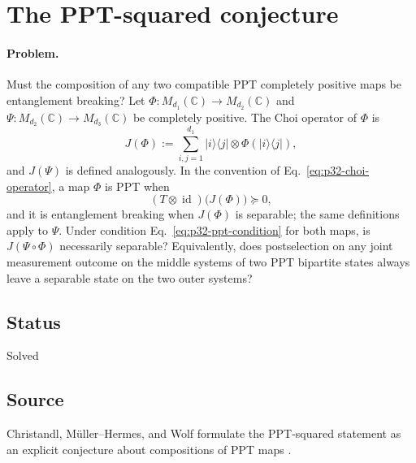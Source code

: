 \section{The PPT-squared conjecture}
\label{sec:op_69520395226dc45a}

\paragraph{Problem.}
Must the composition of any two compatible PPT completely positive maps be
entanglement breaking?  Let
$\Phi:M_{d_1}(\mathbb C)\to M_{d_2}(\mathbb C)$ and
$\Psi:M_{d_2}(\mathbb C)\to M_{d_3}(\mathbb C)$ be completely positive.  The
Choi operator of $\Phi$ is
\begin{equation}
  J(\Phi)
  :=\sum_{i,j=1}^{d_1}\lvert i\rangle\!\langle j\rvert
       \otimes\Phi(\lvert i\rangle\!\langle j\rvert),
  \label{eq:p32-choi-operator}
\end{equation}
and $J(\Psi)$ is defined analogously.  In the convention of
Eq.~\eqref{eq:p32-choi-operator}, a map $\Phi$ is PPT when
\begin{equation}
  (T\otimes\operatorname{id})\bigl(J(\Phi)\bigr)\succeq0,
  \label{eq:p32-ppt-condition}
\end{equation}
and it is entanglement breaking when $J(\Phi)$ is separable; the same
definitions apply to $\Psi$.  Under condition
Eq.~\eqref{eq:p32-ppt-condition} for both maps, is
$J(\Psi\circ\Phi)$ necessarily separable?  Equivalently, does postselection
on any joint measurement outcome on the middle systems of two PPT bipartite
states always leave a separable state on the two outer systems?

\subsection*{Status}

Solved

\subsection*{Source}

Christandl, M\"uller--Hermes, and Wolf formulate the PPT-squared statement as
an explicit conjecture about compositions of PPT maps
.

